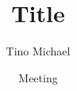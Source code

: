 \documentclass[8pt]{beamer}
\title[short Title]{Title}
\subtitle{}
\author[Tino Michael]{Tino Michael\vspace{-12pt}}
\institute[CEA Saclay]{CEA Saclay, Irfu/SAp}
\date[\mydate]{Meeting\\\mydate}
\newif\ifbackup
\begin{document}
    \begin{frame}
        \titlepage
    \end{frame}



    \ifbackup
        \newcounter{finalframe}
        \setcounter{finalframe}{\value{framenumber}}

        \begin{frame}
            \centering
            \Huge Backup\\
        \end{frame}

        \setcounter{framenumber}{\value{finalframe}}
    \fi
\end{document}
